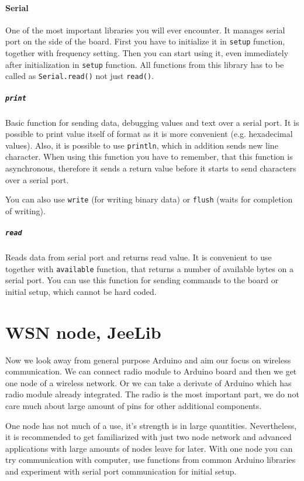 \documentclass[12pt,titlepage]{article}
\begin{document}
        \paragraph{Serial}
        One of the most important libraries you will ever encounter. It manages serial port on the side of the board. First you have to initialize it in  \texttt{setup} function, together with frequency setting. Then you can start using it, even immediately after initialization in \texttt{setup} function. All functions from this library has to be called as \texttt{Serial.read()} not just \texttt{read()}.

            \subparagraph{\texttt{print}}
            Basic function for sending data, debugging values and text over a serial port. It is possible to print value itself of format as it is more convenient (e.g. hexadecimal values). Also, it is possible to use \texttt{println}, which in addition sends new line character. When using this function you have to remember, that this function is asynchronous, therefore it sends a return value before it starts to send characters over a serial port.

            You can also use \texttt{write} (for writing binary data) or \texttt{flush} (waits for completion of writing).

            \subparagraph{\texttt{read}}
          Reads data from serial port and returns read value. It is convenient to use together with \texttt{available} function, that returns a number of available bytes on a serial port. You can use this function for sending commands to the board or initial setup, which cannot be hard coded.

\section{WSN node, JeeLib}
Now we look away from general purpose Arduino and aim our focus on wireless communication. We can connect radio module to Arduino board and then we get one node of a wireless network. Or we can take a derivate of Arduino which has radio module already integrated. The radio is the most important part, we do not care much about large amount of pins for other additional components.

One node has not much of a use, it's strength is in large quantities. Nevertheless, it is recommended to get familiarized with just two node network and advanced applications with large amounts of nodes leave for later. With one node you can try communication with computer, use functions from common Arduino libraries and experiment with serial port communication for initial setup.
\end{document}
